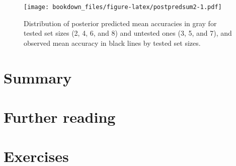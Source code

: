 \documentclass[12pt,]{krantz}
\newenvironment{Shaded}{\begin{snugshade}}{\end{snugshade}}
\newcommand{\CommentTok}[1]{\textcolor[rgb]{0.56,0.35,0.01}{\textit{#1}}}
\newcommand{\DataTypeTok}[1]{\textcolor[rgb]{0.13,0.29,0.53}{#1}}
\newcommand{\DecValTok}[1]{\textcolor[rgb]{0.00,0.00,0.81}{#1}}
\newcommand{\KeywordTok}[1]{\textcolor[rgb]{0.13,0.29,0.53}{\textbf{#1}}}
\newcommand{\NormalTok}[1]{#1}
\newcommand{\OperatorTok}[1]{\textcolor[rgb]{0.81,0.36,0.00}{\textbf{#1}}}
\newcommand{\StringTok}[1]{\textcolor[rgb]{0.31,0.60,0.02}{#1}}
\theoremstyle{definition}
\theoremstyle{definition}
\theoremstyle{definition}
\theoremstyle{remark}
\begin{document}
\begin{Shaded}
\end{Shaded}

\begin{figure}
\centering
\texttt{[image: bookdown\_files/figure-latex/postpredsum2-1.pdf]}
\caption{\label{fig:postpredsum2}Distribution of posterior predicted mean accuracies in gray for tested set sizes (2, 4, 6, and 8) and untested ones (3, 5, and 7), and observed mean accuracy in black lines by tested set sizes.}
\end{figure}

\hypertarget{summary-1}{%
\section{Summary}\label{summary-1}}

\hypertarget{further-reading-3}{%
\section{Further reading}\label{further-reading-3}}

\hypertarget{exercises-2}{%
\section{Exercises}\label{exercises-2}}
\end{document}
